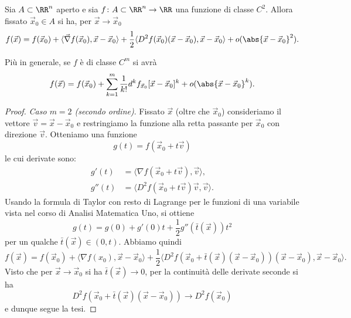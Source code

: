 \begin{theorem}
Sia $A\subset \RR^n$ aperto e 
sia $f\colon A\subset \RR^n \to \RR$ una funzione di classe $C^2$.
Allora fissato $\vec x_0\in A$ si ha, per $\vec x \to \vec x_0$
\begin{equation}\label{eq:taylor_secondo}
  f(\vec x) = f(\vec x_0) + \langle \vec\nabla f(\vec x_0), \vec x - \vec x_0\rangle 
  + \frac 1 2 \langle D^2 f(\vec x_0) (\vec x - \vec x_0), \vec x - \vec x_0\rangle
  + o(\abs{\vec x - \vec x_0}^2).
\end{equation}

Più in generale, se $f$ è di classe $C^m$ si avrà
\[
 f(\vec x) = f(\vec x_0) + \sum_{k=1}^m \frac 1 {k!} d^k f_{\vec x_0}[\vec x-\vec x_0]^k
  + o(\abs{\vec x - \vec x_0}^k).
\]
\end{theorem}
%
\begin{proof}
  \emph{Caso $m=2$ (secondo ordine)}.
Fissato $\vec x$ (oltre che $\vec x_0$) consideriamo 
il vettore $\vec v = \vec x - \vec x_0$ e restringiamo la funzione 
alla retta passante per $\vec x_0$ con direzione $\vec v$.
Otteniamo una funzione 
\[
  g(t) = f(\vec x_0 + t \vec v)
\]
le cui derivate sono:
\begin{align*}
  g'(t) &= \langle \nabla f(\vec x_0 + t\vec v), \vec v\rangle,\\
  g''(t) &= \langle D^2 f(\vec x_0+t\vec v)\vec v, \vec v \rangle.
\end{align*}
Usando la formula di Taylor con resto di Lagrange per le funzioni di una variabile vista nel 
corso di Analisi Matematica Uno, si ottiene
\[
  g(t) = g(0) + g'(0) t + \frac 1 2 g''(\bar t(\vec x)) t^2
\]
per un qualche $\bar t(\vec x)\in (0,t)$. 
Abbiamo quindi 
\[
  f(\vec x) = f(\vec x_0) + \langle \nabla f(x_0), \vec x - \vec x_0\rangle 
  + \frac 1 2 \langle D^2 f(\vec x_0 + \bar t(\vec x)(\vec x - \vec x_0))(\vec x-\vec x_0), \vec x-\vec x_0\rangle.
\]
Visto che per $\vec x \to \vec x_0$ si ha $\bar t(\vec x)\to 0$,
per la continuità delle derivate seconde
si ha 
\[
  D^2 f(\vec x_0 + \bar t(\vec x)(\vec x - \vec x_0))
  \to D^2 f(\vec x_0)
\]
e dunque segue la tesi.
\end{proof}